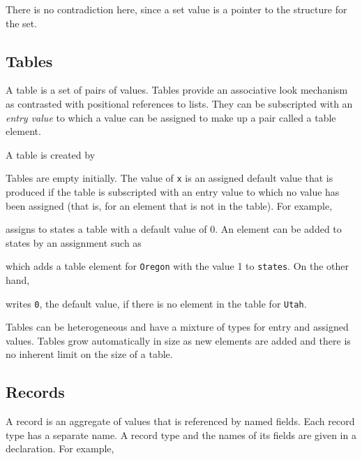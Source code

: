 There is no contradiction here, since a set value is a pointer to the
structure for the set.


\subsection{Tables}

A table is a set of pairs of values. Tables provide an associative
look mechanism as contrasted with positional references to lists. They
can be subscripted with an \textit{entry value }to which a value can
be assigned to make up a pair called a table element.

A table is created by


Tables are empty initially. The value of \texttt{x} is an assigned default
value that is produced if the table is subscripted with an entry value
to which no value has been assigned (that is, for an element that is
not in the table). For example,


\noindent assigns to states a table with a default value of 0. An
element can be added to states by an assignment such as


\noindent which adds a table element for
\texttt{{\textquotedbl}Oregon{\textquotedbl}} with the value 1 to
\texttt{states}. On the other hand,


\noindent writes \texttt{0}, the default value, if there is no element
in the table for \texttt{{\textquotedbl}Utah{\textquotedbl}}.

Tables can be heterogeneous and have a mixture of types for entry and
assigned values. Tables grow automatically in size as new elements are
added and there is no inherent limit on the size of a table.


\subsection{Records}

A record is an aggregate of values that is referenced by named
fields. Each record type has a separate name. A record type and the
names of its fields are given in a declaration. For example,


